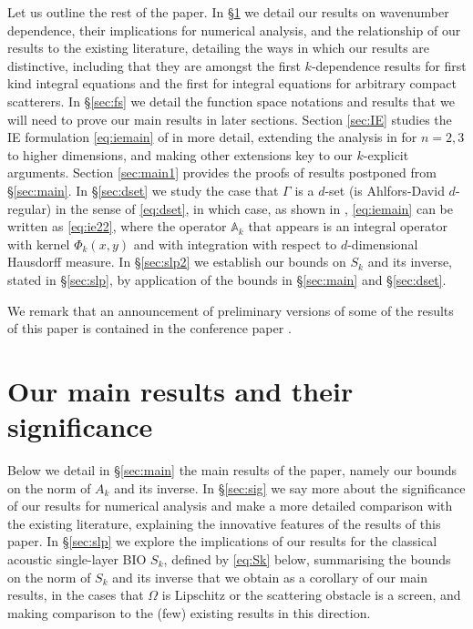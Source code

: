 \documentclass{birkjour}
\theoremstyle{definition}
\theoremstyle{remark}
\numberwithin{equation}{section}
\newcommand{\bA}{\mathbb{A}}
\begin{document}
Let us outline the rest of the paper. In \S\ref{sec:two} we detail our results on wavenumber dependence, their implications for numerical analysis, and the relationship of our results to the existing literature, detailing the ways in which our results are distinctive, including that they are amongst the first $k$-dependence results for first kind integral equations and the first for integral equations for arbitrary compact scatterers.
In \S\ref{sec:fs} we detail the function space notations and results that we will need to prove our main results in later sections. Section \ref{sec:IE} studies the IE formulation \eqref{eq:iemain} of \cite{caetano2025integral} in more detail, extending the analysis in \cite{caetano2025integral} for $n=2,3$ to higher dimensions, and making other extensions key to our $k$-explicit arguments. Section \ref{sec:main1} provides the proofs of results postponed from \S\ref{sec:main}. In \S\ref{sec:dset} we study the case that $\Gamma$ is a $d$-set (is Ahlfors-David $d$-regular) in the sense of \eqref{eq:dset}, in which case, as shown in \cite{caetano2025integral}, \eqref{eq:iemain} can be written as \eqref{eq:ie22}, where the operator $\bA_k$ that appears is an integral operator with kernel $\Phi_k(x,y)$ and with integration with respect to $d$-dimensional Hausdorff measure. %
In \S\ref{sec:slp2} we establish our bounds on $S_k$ and its inverse, stated in \S\ref{sec:slp}, by application of the bounds in \S\ref{sec:main} and \S\ref{sec:dset}. 

We remark that an announcement of preliminary versions of some of the results of this paper is contained in the conference paper \cite{SiavashSimoncon}.
 
\section{Our main results and their significance} \label{sec:two} 
Below we detail in \S\ref{sec:main} the main results of the paper, namely our bounds on the norm of $A_k$ and its inverse. In \S\ref{sec:sig} we say more about the significance of our results for numerical analysis and make a more detailed comparison with the existing literature, explaining the innovative features of the results of this paper. In \S\ref{sec:slp} we explore the implications of our results for the classical acoustic single-layer BIO $S_k$, defined by \eqref{eq:Sk} below, summarising the bounds on the norm of $S_k$ and its inverse that we obtain as a corollary of our main results, in the cases that $\Omega$ is Lipschitz or the scattering obstacle is a screen, and making comparison to the (few) existing results in this direction. 
\end{document}
